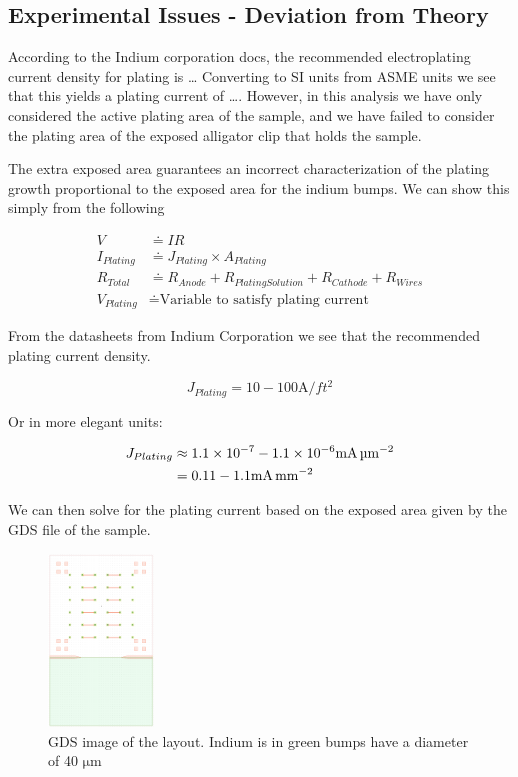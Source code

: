 \subsection{Experimental Issues - Deviation from Theory}

According to the Indium corporation docs, the recommended electroplating current density for plating is \dots
Converting to SI units from ASME units we see that this yields a plating current of \dots. However, in this analysis we have only considered the active plating area of the sample, and we have failed to consider the plating area of the exposed alligator clip that holds the sample.

The extra exposed area guarantees an incorrect characterization of the plating growth proportional to the exposed area for the indium bumps. We can show this simply from the following

\begin{equation}\tag{A}
    \begin{split}
        V &\doteq I R \\
        I_{Plating} &\doteq J_{Plating} \times A_{Plating} \\
        R_{Total} &\doteq R_{Anode} + R_{Plating Solution} + R_{Cathode} + R_{Wires} \\
        V_{Plating} &\doteq \text{Variable to satisfy plating current}
    \end{split}
\end{equation}

From the datasheets from Indium Corporation \cite{indiumCorpPlating} we see that the recommended plating current density.

$$
    J_{Plating} = 10-100 \unit{\ampere\per ft^2}
$$

Or in more elegant units:

\begin{equation}\notag
    \begin{split}
        J_{Plating} &\approx 1.1\times10^{-7}-1.1\times10^{-6}
        \unit{\milli\ampere\per\square\micro\meter} \\
        &= 0.11-1.1 \junits
    \end{split}
\end{equation}


We can then solve for the plating current based on the exposed area given by the GDS file of the sample.


\begin{figure}
    \centering
    \includegraphics[width=0.25\textwidth]{Main/Ch1/GDS_V1.png}
    \caption{GDS image of the layout. Indium is in green bumps have a diameter of 40 $\unit{\micro\meter}$}
\end{figure}


